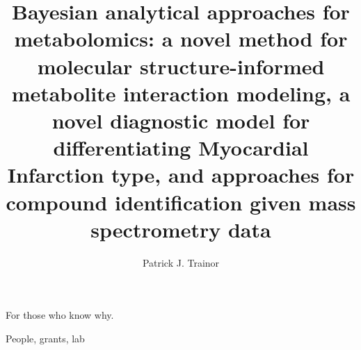 \documentclass[final]{ulthesis}
\begin{document}
\author{Patrick J. Trainor}


\title{Bayesian analytical approaches for metabolomics: a novel method for molecular structure-informed metabolite interaction modeling, a novel diagnostic model for differentiating Myocardial Infarction type, and  approaches for compound identification given mass spectrometry data}









\frontmatter

\maketitle

\begin{dedication}
For those who know why.
\end{dedication}

\begin{acknowledgments}
People, grants, lab
\end{acknowledgments}
\end{document}
